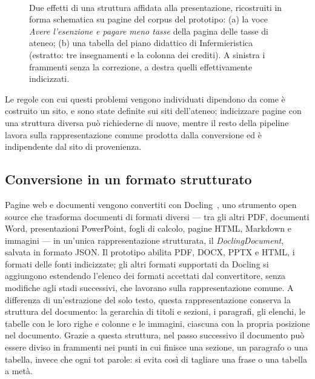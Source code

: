 \begin{figure}[H]
\begin{minipage}[t]{0.48\textwidth}
    \\[3pt]
  \end{minipage}
  \caption{Due effetti di una struttura affidata alla presentazione, ricostruiti in forma schematica su pagine del
  corpus del prototipo: (a) la voce \emph{Avere l'esenzione e pagare meno tasse} della pagina delle tasse di ateneo;
  (b) una tabella del piano didattico di Infermieristica (estratto: tre insegnamenti e la colonna dei crediti). A sinistra i frammenti senza la correzione, a destra
  quelli effettivamente indicizzati.}
  \label{fig:struttura-presentazione}
\end{figure}

Le regole con cui questi problemi vengono individuati dipendono da come è costruito un sito, e sono state definite
sui siti dell'ateneo; indicizzare pagine con una struttura diversa può richiederne di nuove, mentre il resto della
pipeline lavora sulla rappresentazione comune prodotta dalla conversione ed è indipendente dal sito di provenienza.

\subsection{Conversione in un formato strutturato}

Pagine web e documenti vengono convertiti con Docling~\cite{docling2024}, uno strumento open source che trasforma
documenti di formati diversi --- tra gli altri PDF, documenti Word, presentazioni PowerPoint, fogli di calcolo, pagine
HTML, Markdown e immagini --- in un'unica rappresentazione strutturata, il \emph{DoclingDocument}, salvata in formato
JSON. Il prototipo abilita PDF, DOCX, PPTX e HTML, i formati delle fonti indicizzate; gli altri formati supportati da
Docling si aggiungono estendendo l'elenco dei formati accettati dal convertitore, senza modifiche agli stadi
successivi, che lavorano sulla rappresentazione comune. A differenza di un'estrazione del solo testo, questa rappresentazione
conserva la struttura del documento: la gerarchia di titoli e sezioni, i paragrafi, gli elenchi, le tabelle con le
loro righe e colonne e le immagini, ciascuna con la propria posizione nel documento. Grazie a questa struttura,
nel passo successivo il documento può essere diviso in frammenti nei punti in cui finisce una sezione, un paragrafo
o una tabella, invece che ogni tot parole: si evita così di tagliare una frase o una tabella a metà.

